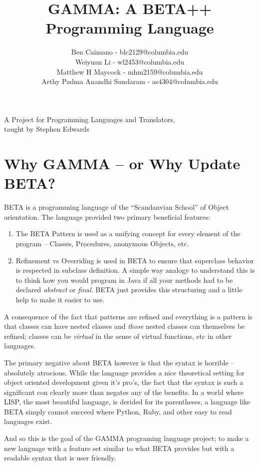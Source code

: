 \documentclass[10pt]{article}
\title{GAMMA: A BETA++ Programming Language}
\author{
	Ben Caimano - blc2129@columbia.edu \\
	Weiyuan Li - wl2453@columbia.edu \\
	Matthew H Maycock - mhm2159@columbia.edu \\
	Arthy Padma Anandhi Sundaram - as4304@columbia.edu
}
\date{}
\begin{document}
\maketitle
\begin{center}
\large
A Project for Programming Languages and Translators,
\\taught by Stephen Edwards
\end{center}


\section*{Why GAMMA -- or Why Update BETA?}
BETA is a programming language of the ``Scandanvian School'' of Object
orientation. The language provided two primary beneficial features:

\begin{enumerate}
\item The BETA Pattern is used as a unifying concept for every element
of the program -- Classes, Procedures, anonymous Objects, etc.
\item Refinement vs Overriding is used in BETA to ensure that superclass
behavior is respected in subclass definition. A simple way analogy to
understand this is to think how you would program in Java if all your
methods had to be declared \emph{abstract} or \emph{final}. BETA just
provides this structuring and a little help to make it easier to use.
\end{enumerate}

A consequence of the fact that patterns are refined and everything is a
pattern is that classes can have nested classes and \emph{those} nested
classes can themselves be refined; classes can be \emph{virtual} in the
sense of virtual functions, etc in other languages.

The primary negative about BETA however is that the syntax is horrible
-- absolutely atrocious. While the language provides a nice theoretical
setting for object oriented development given it's pro's, the fact that
the syntax is such a significant con clearly more than negates any of
the benefits. In a world where LISP, the most beautiful language, is
derided for its parentheses, a language like BETA simply cannot succeed
where Python, Ruby, and other easy to read languages exist.

And so this is the goal of the GAMMA programing language project; to
make a new language with a feature set similar to what BETA provides but
with a readable syntax that is user friendly.
\end{document}
